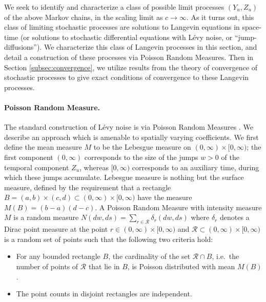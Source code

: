 \documentclass[a4paper,12pt]{article}
\numberwithin{equation}{section}
\theoremstyle{plain}
\theoremstyle{definition}
\theoremstyle{remark}
\numberwithin{equation}{section}
\newcommand{\1}{\mathbf 1}
\begin{document}
We seek to identify and characterize a class of possible limit processes
$(Y_u, Z_u)$ of the above Markov chains,
in the scaling limit as $c \to \infty$. As it turns out, this class of 
limiting stochastic processes are solutions to
Langevin equations in space-time (or solutions to stochastic differential
equations with L\'evy noise, or ``jump-diffusions'').
We characterize this class of Langevin processes in this section, and detail 
a construction of these processes via Poisson Random Measures.
Then in Section \ref{subsec:convergence}, we utilize results from the theory of
convergence of stochastic processes to give exact conditions of convergence
to these Langevin processes.

\paragraph{Poisson Random Measure.}
The standard construction of L\'evy noise is via Poisson Random Measures
\cite{Applebaum}.  We describe an approach which is amenable to spatially 
varying coefficients. 
We first define the mean measure $M$ to be the Lebesgue measure on 
$(0,\infty) \times [0,\infty)$; the first component $(0,\infty)$ corresponds 
to the size of the jumps $w > 0$ of the temporal component $Z_u$, whereas $[0,\infty)$
corresponds to an auxiliary time, during which these jumps accumulate. 
Lebesgue measure is nothing but the surface measure, defined by the requirement 
that a rectangle $B = (a,b) \times (c,d) \subset (0,\infty) \times [0,\infty)$
have the measure $M(B) = (b-a)(d-c)$.  
A Poisson Random Measure with intensity measure $M$ is a random measure 
$N(dw, ds) = \sum_{r \in \mathcal R} \delta_{r}(dw, ds)$ where $\delta_r$ 
denotes a Dirac point measure at the point $r \in (0,\infty) \times [0,\infty)$
and $\mathcal R \subset (0,\infty) \times [0,\infty)$ is a random set of points 
such that the following two criteria hold: 
\begin{itemize}
  \item 
  For any bounded rectangle $B$, the cardinality of the set $\mathcal R \cap B$,
  i.e.\ the number of 
  points of $\mathcal R$ that lie in $B$, is Poisson distributed with mean 
  $M(B)$.
  \item
  The point counts in disjoint rectangles are independent. 
\end{itemize}
\end{document}
